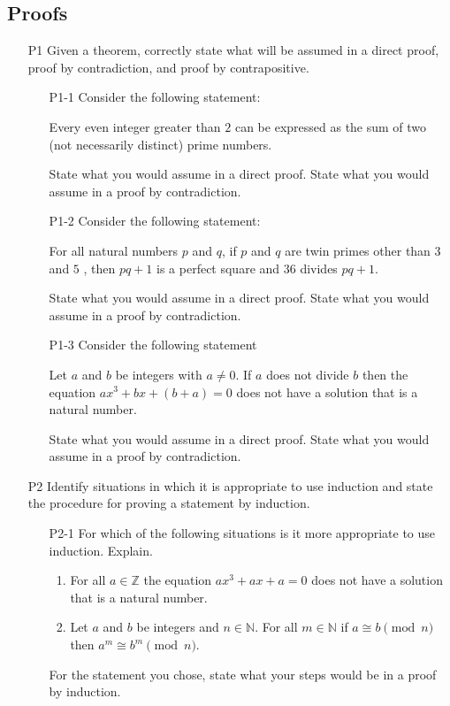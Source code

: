 \documentclass[11pt]{article}
\newcommand{\Z}{\mathbb{Z}}
\begin{document}
\subsection*{Proofs}
\begin{itemize}
\item[P1]  Given a theorem, correctly state what will be assumed in a direct proof, proof by contradiction, and proof by contrapositive.
	\begin{enumerate}
	\item[P1-1] Consider the following statement:
		\begin{center}
		Every even integer greater than $2$ can be expressed as the sum of two (not necessarily distinct) prime numbers.
		\end{center}
	State what you would assume in a direct proof. State what you would assume in a proof by contradiction.
	\item[P1-2]  Consider the following statement:
		\begin{center}
		For all natural numbers $p$ and $q$, if $p$ and $q$ are twin primes other than $3$ and $5$ , then $pq+1$ is a perfect square and $36$ divides $pq+1$.
		\end{center}
		State what you would assume in a direct proof. State what you would assume in a proof by contradiction.
	\item[P1-3]  Consider the following statement
		\begin{center}
		Let $a$ and $b$ be integers with $a\neq 0$. If $a$ does not divide $b$ then the equation $ax^3+bx+(b+a) = 0$ does not have a solution that is a natural number.
		\end{center}
		State what you would assume in a direct proof. State what you would assume in a proof by contradiction.
	\end{enumerate}
	
	
	\newpage
	
	
\item[P2]  Identify situations in which it is appropriate to use induction and state the procedure for proving a statement by induction.


\begin{enumerate}
	\item[P2-1] For which of the following situations is it more appropriate to use induction. Explain.
		\begin{enumerate}
		\item For all $a\in\Z$ the equation $ax^3+ax + a = 0$ does not have a solution that is a natural number.
		\item Let $a$ and $b$ be integers and $n\in \mathbb{N}$. For all $m\in\mathbb{N}$ if $a\cong b \pmod{n}$ then $a^m \cong b^m \pmod{n}$.
		\end{enumerate}
	For the statement you chose, state what your steps would be in a proof by induction.




\end{enumerate}
\end{itemize}
\end{document}
